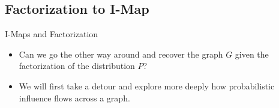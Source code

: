 \documentclass[11pt]{beamer}
\begin{document}
\subsection{Factorization to I-Map}

\begin{frame}{I-Maps and Factorization}
\begin{itemize}
	\item Can we go the other way around and recover the graph $G$ given the
	factorization of the distribution $P$?
	\item We will first take a detour and explore more deeply how
	probabilistic influence flows across a graph.
\end{itemize}
\end{frame}

\captionsetup[subfigure]{position=bottom,labelformat=parens}

\newcommand{\trailseries}
{
	\subfloat[][]{
		\begin{tikzpicture}[every node/.style=
		{
			circle,
			draw=black,
			fill=white!80!black
		}]
		\tiny
		\node (x) at (0,1.0) {$X$};
		\node (z) at (0,0) {$Z$};
		\node (y) at (0,-1.0) {$Y$};
		\draw[-stealth] (x)--(z);
		\draw[-stealth] (z)--(y);
		\end{tikzpicture}
	}%
	\hspace{0.4cm}
	\subfloat[][]{
		\begin{tikzpicture}[every node/.style=
		{
			circle,
			draw=black,
			fill=white!80!black
		}]
		\tiny
		\node (y) at (0,1.0) {$Y$};
		\node (z) at (0,0) {$Z$};
		\node (x) at (0,-1.0) {$X$};
		\draw[-stealth] (y)--(z);
		\draw[-stealth] (z)--(x);
		\end{tikzpicture}
	}%
	\hspace{0.4cm}
	\subfloat[][]{
		\begin{tikzpicture}[every node/.style=
		{
			circle,
			draw=black,
			fill=white!80!black
		}]
		\tiny
		\node (x) at (-0.6,0) {$X$};
		\node (z) at (0,1) {$Z$};
		\node (y) at (0.6,0) {$Y$};
		\draw[-stealth] (z)--(x);
		\draw[-stealth] (z)--(y);
		\end{tikzpicture}
	}%
	\subfloat[][]{
		\begin{tikzpicture}[every node/.style=
		{
			circle,
			draw=black,
			fill=white!80!black
		}]
		\tiny
		\node (x) at (-0.6,1) {$X$};
		\node (z) at (0,0) {$Z$};
		\node (y) at (0.6,1) {$Y$};
		\draw[-stealth] (x)--(z);
		\draw[-stealth] (y)--(z);
		\end{tikzpicture}
	}
}
\end{document}

